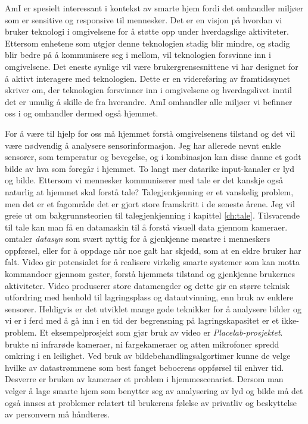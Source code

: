 AmI er spesielt interessant i kontekst av smarte hjem fordi det omhandler miljøer som er sensitive og responsive til mennesker. Det er en visjon på hvordan vi bruker teknologi i omgivelsene for å støtte opp under hverdagslige aktiviteter. Ettersom enhetene som utgjør denne teknologien stadig blir mindre, og stadig blir bedre på å kommunisere seg i mellom, vil teknologien forsvinne inn i omgivelsene. Det eneste synlige vil være brukergrensesnittene vi har designet for å aktivt interagere med teknologien. Dette er en videreføring av framtidssynet \citet{weiser91} skriver om, der teknologien forsvinner inn i omgivelsene og hverdagslivet inntil det er umulig å skille de fra hverandre. AmI omhandler alle miljøer vi befinner oss i og omhandler dermed også hjemmet.

For å være til hjelp for oss må hjemmet forstå omgivelsenens tilstand og det vil være nødvendig å analysere sensorinformasjon. Jeg har allerede nevnt enkle sensorer, som temperatur og bevegelse, og i kombinasjon kan disse danne et godt bilde av hva som foregår i hjemmet. To langt mer datarike input-kanaler er lyd og bilde. Ettersom vi mennesker kommuniserer med tale er det kanskje også naturlig at hjemmet skal forstå tale? Talegjenkjenning er et vanskelig problem, men det er et fagområde det er gjort store framskritt i de seneste årene. Jeg vil greie ut om bakgrunnsteorien til talegjenkjenning i kapittel \ref{ch:tale}. Tilsvarende til tale kan man få en datamaskin til å forstå visuell data gjennom kameraer. \citet{augustonugent06} omtaler \emph{datasyn} som svært nyttig for å gjenkjenne mønstre i menneskers oppførsel, eller for å oppdage når noe galt har skjedd, som at en eldre bruker har falt. Video gir potensialet for å realisere virkelig smarte systemer som kan motta kommandoer gjennom gester, forstå hjemmets tilstand og gjenkjenne brukernes aktiviteter. Video produserer store datamengder og dette gir en større teknisk utfordring med henhold til lagringsplass og datautvinning, enn bruk av enklere sensorer. Heldigvis er det utviklet mange gode teknikker for å analysere bilder og vi er i ferd med å gå inn i en tid der begrensning på lagringskapasitet er et ikke-problem. Et eksempelprosjekt som gjør bruk av video er \emph{Placelab-prosjektet}. \citet{placelab05} brukte ni infrarøde kameraer, ni fargekameraer og atten mikrofoner spredd omkring i en leilighet. Ved bruk av bildebehandlingsalgortimer kunne de velge hvilke av datastrømmene som best fanget beboerens oppførsel til enhver tid. Desverre er bruken av kameraer et problem i hjemmescenariet. Dersom man velger å lage smarte hjem som benytter seg av analysering av lyd og bilde må det også innses at problemer relatert til brukerens følelse av privatliv og beskyttelse av personvern må håndteres.

